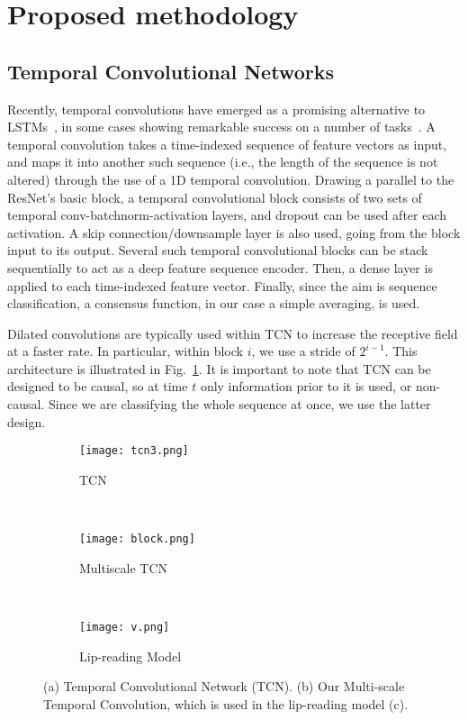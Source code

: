 \documentclass{article}
\begin{document}
\section{Proposed methodology}
\label{Methodology}


\subsection{Temporal Convolutional Networks} 
\label{ssec:tcn}

Recently, temporal convolutions have emerged as a promising alternative to LSTMs~\cite{BaiTCN2018}, in some cases showing remarkable success on a number of tasks~\cite{wavenet}. A temporal convolution takes a time-indexed sequence of feature vectors as input, and maps it into another such sequence (i.e., the length of the sequence is not altered) through the use of a 1D temporal convolution. Drawing a parallel to the ResNet's basic block, a temporal convolutional block consists of two sets of temporal conv-batchnorm-activation layers, and dropout can be used after each activation. A skip connection/downsample layer is also used, going from the block input to its output. Several such temporal convolutional blocks can be stack sequentially to act as a deep feature sequence encoder. Then, a dense layer is applied to each time-indexed feature vector. Finally, since the aim is sequence classification, a consensus function, in our case a simple averaging, is used.

Dilated convolutions are typically used within TCN to increase the receptive field at a faster rate. In particular, within block $i$, we use a stride of $2^{i-1}$. This architecture is illustrated in Fig.~\ref{fig:TCN}. It is important to note that TCN can be designed to be causal, so at time $t$ only information prior to it is used, or non-causal. Since we are classifying the whole sequence at once, we use the latter design.


\begin{figure*}
    \centering
    \begin{subfigure}[b]{0.45\textwidth}
        \texttt{[image: tcn3.png]}
        \caption{TCN}
        \label{fig:TCN}
    \end{subfigure}
    ~ \begin{subfigure}[b]{0.34\textwidth}
        \texttt{[image: block.png]}
        \caption{Multiscale TCN}
        \label{fig:MultiTCN}
    \end{subfigure} 
    ~ \begin{subfigure}[b]{0.18\textwidth}
        \texttt{[image: v.png]}
        \caption{Lip-reading Model}
        \label{fig:LipreadingModel}
    \end{subfigure}
    \caption{(a) Temporal Convolutional Network (TCN). (b) Our Multi-scale Temporal Convolution, which is used in the lip-reading model (c).}\label{fig:modelFig}
\end{figure*}
\end{document}
